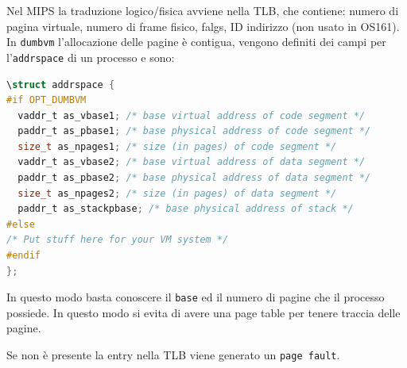 \documentclass[12pt]{article}
\begin{document}
Nel MIPS la traduzione logico/fisica avviene nella TLB, che contiene: numero di pagina virtuale, numero di frame fisico, falgs, ID indirizzo (non usato in OS161). In \texttt{dumbvm} l'allocazione delle pagine \`e contigua, vengono definiti dei campi per l'\texttt{addrspace} di un processo e sono:
\begin{lstlisting}[language=c]
\struct addrspace {
#if OPT_DUMBVM
  vaddr_t as_vbase1; /* base virtual address of code segment */
  paddr_t as_pbase1; /* base physical address of code segment */
  size_t as_npages1; /* size (in pages) of code segment */
  vaddr_t as_vbase2; /* base virtual address of data segment */
  paddr_t as_pbase2; /* base physical address of data segment */
  size_t as_npages2; /* size (in pages) of data segment */
  paddr_t as_stackpbase; /* base physical address of stack */
#else
/* Put stuff here for your VM system */
#endif
};
\end{lstlisting}
In questo modo basta conoscere il \texttt{base} ed il numero di pagine che il processo possiede. In questo modo si evita di avere una page table per tenere traccia delle pagine.

Se non \`e presente la entry nella TLB viene generato un \texttt{page fault}.
\end{document}
